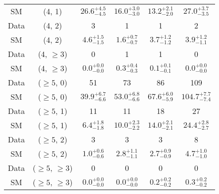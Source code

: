 \begin{table}[h!]
{\begin{tabular}{cccccc}
	SM & (4, 1) & $26.6^{+ 4.5 }_{- 4.5 }$ & $16.0^{+ 3.0 }_{- 3.0 }$ & $13.2^{+ 2.1 }_{- 2.0 }$ & $27.0^{+ 3.7 }_{- 3.5 }$ \\[0.5ex] 
	Data & (4, 2) & 3 & 1 & 1 & 2 \\[0.5ex] 
	SM & (4, 2) & $4.6^{+ 1.5 }_{- 1.5 }$ & $1.6^{+ 0.7 }_{- 0.7 }$ & $3.7^{+ 1.2 }_{- 1.2 }$ & $3.9^{+ 1.2 }_{- 1.1 }$ \\[0.5ex] 
	Data & (4, $\ge3$) & 0 & 1 & 1 & 0 \\[0.5ex] 
	SM & (4, $\ge3$) & $0.0^{+ 0.0 }_{- 0.0 }$ & $0.3^{+ 0.4 }_{- 0.3 }$ & $0.1^{+ 0.1 }_{- 0.1 }$ & $0.0^{+ 0.0 }_{- 0.0 }$ \\[0.5ex] 
	Data & ($\ge5$, 0) & 51 & 73 & 86 & 109 \\[0.5ex] 
	SM & ($\ge5$, 0) & $39.9^{+ 6.7 }_{- 6.6 }$ & $53.0^{+ 6.8 }_{- 6.6 }$ & $67.6^{+ 6.0 }_{- 5.9 }$ & $104.7^{+ 7.7 }_{- 7.4 }$ \\[0.5ex] 
	Data & ($\ge5$, 1) & 11 & 11 & 18 & 27 \\[0.5ex] 
	SM & ($\ge5$, 1) & $6.4^{+ 1.8 }_{- 1.8 }$ & $10.0^{+ 2.3 }_{- 2.2 }$ & $14.0^{+ 2.1 }_{- 2.1 }$ & $24.4^{+ 2.8 }_{- 2.7 }$ \\[0.5ex] 
	Data & ($\ge5$, 2) & 3 & 3 & 3 & 8 \\[0.5ex] 
	SM & ($\ge5$, 2) & $1.0^{+ 0.6 }_{- 0.6 }$ & $2.8^{+ 1.1 }_{- 1.1 }$ & $2.7^{+ 0.9 }_{- 0.9 }$ & $4.7^{+ 1.0 }_{- 1.0 }$ \\[0.5ex] 
	Data & ($\ge5$, $\ge3$) & 0 & 0 & 0 & 0 \\[0.5ex] 
	SM & ($\ge5$, $\ge3$) & $0.0^{+ 0.0 }_{- 0.0 }$ & $0.0^{+ 0.0 }_{- 0.0 }$ & $0.2^{+ 0.2 }_{- 0.2 }$ & $0.3^{+ 0.2 }_{- 0.2 }$ \\[0.5ex] 
	\hline
	\hline
\end{tabular}}
\end{table}
